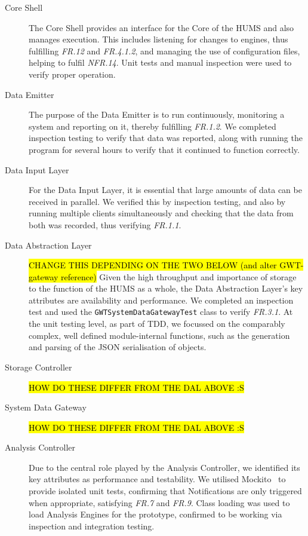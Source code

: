 \documentclass[10pt,a4paper]{article}
\begin{document}
\begin{description}

  \item[Core Shell] The Core Shell provides an interface for the Core of the HUMS and also manages execution. This includes listening for changes to engines, thus fulfilling \emph{FR.12} and \emph{FR.4.1.2}, and managing the use of configuration files, helping to fulfil \emph{NFR.14}. Unit tests and manual inspection were used to verify proper operation.

  \item[Data Emitter] The purpose of the Data Emitter is to run continuously, monitoring a system and reporting on it, thereby fulfilling \emph{FR.1.2}. We completed inspection testing to verify that data was reported, along with running the program for several hours to verify that it continued to function correctly.

  \item[Data Input Layer] For the Data Input Layer, it is essential that large amounts of data can be received in parallel. We verified this by inspection testing, and also by running multiple clients simultaneously and checking that the data from both was recorded, thus verifying \emph{FR.1.1}.

  \item[Data Abstraction Layer] \hl{CHANGE THIS DEPENDING ON THE TWO BELOW (and alter GWT-gateway reference)} Given the high throughput and importance of storage to the function of the HUMS as a whole, the Data Abstraction Layer's key attributes are availability and performance. We completed an inspection test and used the \texttt{GWTSystemDataGatewayTest} class to verify \emph{FR.3.1}. At the unit testing level, as part of TDD, we focussed on the comparably complex, well defined module-internal functions, such as the generation and parsing of the JSON serialisation of objects.

  \item[Storage Controller] \hl{HOW DO THESE DIFFER FROM THE DAL ABOVE :S}

  \item[System Data Gateway] \hl{HOW DO THESE DIFFER FROM THE DAL ABOVE :S}

  \item[Analysis Controller] Due to the central role played by the Analysis Controller, we identified its key attributes as performance and testability. We utilised Mockito~\cite{mockito} to provide isolated unit tests, confirming that Notifications are only triggered when appropriate, satisfying \emph{FR.7} and \emph{FR.9}. Class loading was used to load Analysis Engines for the prototype, confirmed to be working via inspection and integration testing.


\end{description}
\end{document}
